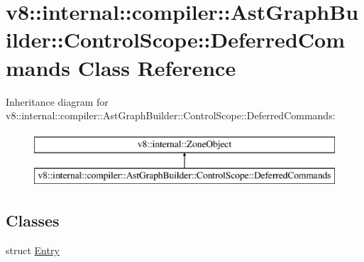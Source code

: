 \hypertarget{classv8_1_1internal_1_1compiler_1_1_ast_graph_builder_1_1_control_scope_1_1_deferred_commands}{}\section{v8\+:\+:internal\+:\+:compiler\+:\+:Ast\+Graph\+Builder\+:\+:Control\+Scope\+:\+:Deferred\+Commands Class Reference}
\label{classv8_1_1internal_1_1compiler_1_1_ast_graph_builder_1_1_control_scope_1_1_deferred_commands}
Inheritance diagram for v8\+:\+:internal\+:\+:compiler\+:\+:Ast\+Graph\+Builder\+:\+:Control\+Scope\+:\+:Deferred\+Commands\+:\begin{figure}[H]
\begin{center}
\leavevmode
\includegraphics[height=2.000000cm]{classv8_1_1internal_1_1compiler_1_1_ast_graph_builder_1_1_control_scope_1_1_deferred_commands}
\end{center}
\end{figure}
\subsection*{Classes}
\begin{DoxyCompactItemize}
\item 
struct \hyperlink{structv8_1_1internal_1_1compiler_1_1_ast_graph_builder_1_1_control_scope_1_1_deferred_commands_1_1_entry}{Entry}
\end{DoxyCompactItemize}
